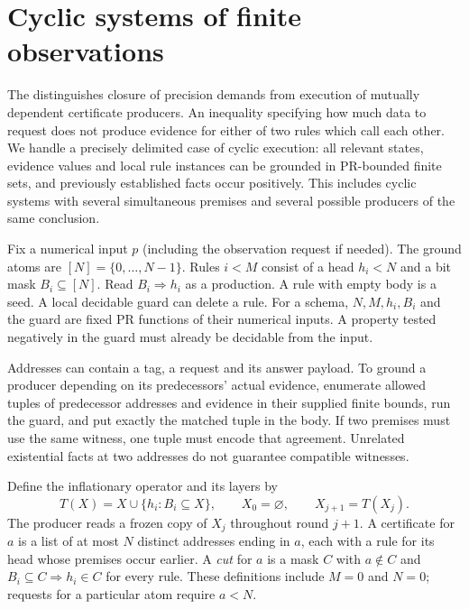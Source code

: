 

\section{Cyclic systems of finite observations}\label{sec:closure}
The  distinguishes closure of precision demands from execution of mutually dependent certificate producers. An inequality specifying how much data to request does not produce evidence for either of two rules which call each other. We handle a precisely delimited case of cyclic execution: all relevant states, evidence values and local rule instances can be grounded in PR-bounded finite sets, and previously established facts occur positively. This includes cyclic systems with several simultaneous premises and several possible producers of the same conclusion.

\begin{definition}
Fix a numerical input $p$ (including the observation request if needed). The ground atoms are $[N]=\{0,\ldots,N-1\}$. Rules $i<M$ consist of a head $h_i<N$ and a bit mask $B_i\subseteq[N]$. Read $B_i\Rightarrow h_i$ as a production. A rule with empty body is a seed. A local decidable guard can delete a rule. For a schema, $N,M,h_i,B_i$ and the guard are fixed PR functions of their numerical inputs. A property tested negatively in the guard must already be decidable from the input.
\end{definition}
Addresses can contain a tag, a request and its answer payload. To ground a producer depending on its predecessors' actual evidence, enumerate allowed tuples of predecessor addresses and evidence in their supplied finite bounds, run the guard, and put exactly the matched tuple in the body. If two premises must use the same witness, one tuple must encode that agreement. Unrelated existential facts at two addresses do not guarantee compatible witnesses.

Define the inflationary operator and its layers by
\[
 T(X)=X\cup\{h_i:B_i\subseteq X\},\qquad X_0=\varnothing,\qquad X_{j+1}=T(X_j).
\]
The producer reads a frozen copy of $X_j$ throughout round $j+1$. A certificate for $a$ is a list of at most $N$ distinct addresses ending in $a$, each with a rule for its head whose premises occur earlier. A \emph{cut} for $a$ is a mask $C$ with $a\notin C$ and $B_i\subseteq C\Rightarrow h_i\in C$ for every rule. These definitions include $M=0$ and $N=0$; requests for a particular atom require $a<N$.

